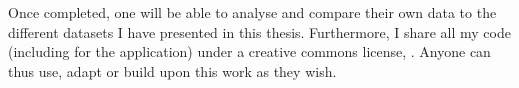Once completed, one will be able to analyse and compare their own data
to the different datasets I have presented in this thesis.
Furthermore, I share all my code (including for the application)
under a creative commons license,
.
Anyone can thus use, adapt or build upon this work as they wish.\mybr\


%
%
%
%
%
%
%


